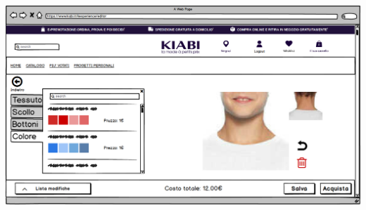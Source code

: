 \documentclass[12pt,italian,]{report}
\begin{document}
\\
\\
\includegraphics{balsamiq/Editor - caratteristica collo colore.png}
\end{document}
